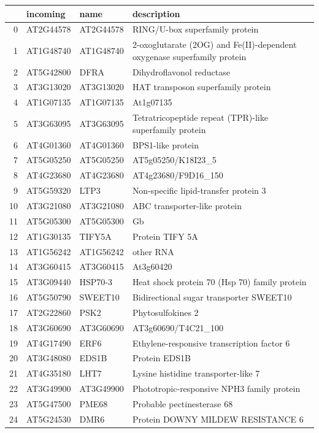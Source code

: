 \documentclass[11pt]{article}
\begin{document}
\begin{center}
\begin{tabular}{rlll}
 & incoming & name & description\\
\hline
0 & AT2G44578 & AT2G44578 & RING/U-box superfamily protein\\
1 & AT1G48740 & AT1G48740 & 2-oxoglutarate (2OG) and Fe(II)-dependent oxygenase superfamily protein\\
2 & AT5G42800 & DFRA & Dihydroflavonol reductase\\
3 & AT3G13020 & AT3G13020 & HAT transposon superfamily protein\\
4 & AT1G07135 & AT1G07135 & At1g07135\\
5 & AT3G63095 & AT3G63095 & Tetratricopeptide repeat (TPR)-like superfamily protein\\
6 & AT4G01360 & AT4G01360 & BPS1-like protein\\
7 & AT5G05250 & AT5G05250 & AT5g05250/K18I23\_5\\
8 & AT4G23680 & AT4G23680 & AT4g23680/F9D16\_150\\
9 & AT5G59320 & LTP3 & Non-specific lipid-transfer protein 3\\
10 & AT3G21080 & AT3G21080 & ABC transporter-like protein\\
11 & AT5G05300 & AT5G05300 & Gb\\
12 & AT1G30135 & TIFY5A & Protein TIFY 5A\\
13 & AT1G56242 & AT1G56242 & other RNA\\
14 & AT3G60415 & AT3G60415 & At3g60420\\
15 & AT3G09440 & HSP70-3 & Heat shock protein 70 (Hsp 70) family protein\\
16 & AT5G50790 & SWEET10 & Bidirectional sugar transporter SWEET10\\
17 & AT2G22860 & PSK2 & Phytosulfokines 2\\
18 & AT3G60690 & AT3G60690 & AT3g60690/T4C21\_100\\
19 & AT4G17490 & ERF6 & Ethylene-responsive transcription factor 6\\
20 & AT3G48080 & EDS1B & Protein EDS1B\\
21 & AT4G35180 & LHT7 & Lysine histidine transporter-like 7\\
22 & AT3G49900 & AT3G49900 & Phototropic-responsive NPH3 family protein\\
23 & AT5G47500 & PME68 & Probable pectinesterase 68\\
24 & AT5G24530 & DMR6 & Protein DOWNY MILDEW RESISTANCE 6\\
\end{tabular}
\end{center}
\end{document}
